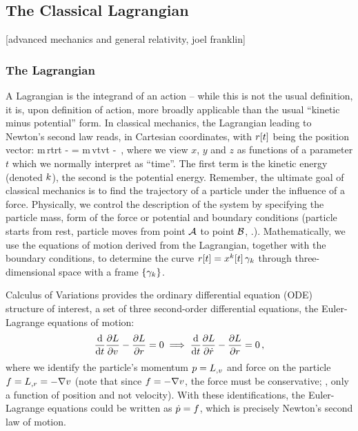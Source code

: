\subsection{The Classical Lagrangian}

[advanced mechanics and general relativity, joel franklin]

\subsubsection{The Lagrangian}
A Lagrangian is the integrand of an action -- while this is not the usual definition, it is, upon definition of action, more broadly applicable than the usual ``kinetic minus potential'' form. In classical mechanics, the Lagrangian leading to Newton's second law reads, in Cartesian coordinates, with $r\!\left[{t}\right]$ being the position vector:
\beq
\lag {} {}m\,\dt r\vat t\iprod \dt r\vat t - \pen{}
      = m\,v\vat t\iprod v\vat t - \pen{}\,,
\eeq
where we view $x$, $y$ and $z$ as functions of a parameter $t$ which we normally interpret as ``time''. The first term is the kinetic energy (denoted $k$), the second is the potential energy. Remember, the ultimate goal of classical mechanics is to find the trajectory of a particle under the influence of a force. Physically, we control the description of the system by specifying the particle mass, form of the force or potential and boundary conditions (particle starts from rest, particle moves from point $\mathcal{A}$ to point $\mathcal{B}$, \etc.). Mathematically, we use the equations of motion derived from the Lagrangian, together with the boundary conditions, to determine the curve $r\!\left[{t}\right] = {x}^{k}\!\left[{t}\right]\gamma_{k}$ through three-dimensional space with a frame $\left\lbrace{\gamma_{k}}\right\rbrace$.

Calculus of Variations provides the ordinary differential equation (ODE) structure of interest, a set of three second-order differential equations, the Euler-Lagrange equations of motion:
\begin{equation}\label{eq:eulerlageqnsvectorform}
\dfrac{\text{d}{}}{\text{d}{t}}\dfrac{\partial{L}}{\partial{v}} - \dfrac{\partial{L}}{\partial{r}} = 0 \implies \dfrac{\text{d}{}}{\text{d}{t}}\dfrac{\partial{L}}{\partial{\dot{r}}} - \dfrac{\partial{L}}{\partial{r}} = 0\,,
\end{equation}
where we identify the particle's momentum $p = {L}_{,{v}}$ and force on the particle $f = {L}_{,{r}} = -\nabla v$ (note that since $f = -\nabla v$, the force must be conservative; \ie, only a function of position and not velocity). With these identifications, the Euler-Lagrange equations could be written as $\dot{p} = f$, which is precisely Newton's second law of motion.

